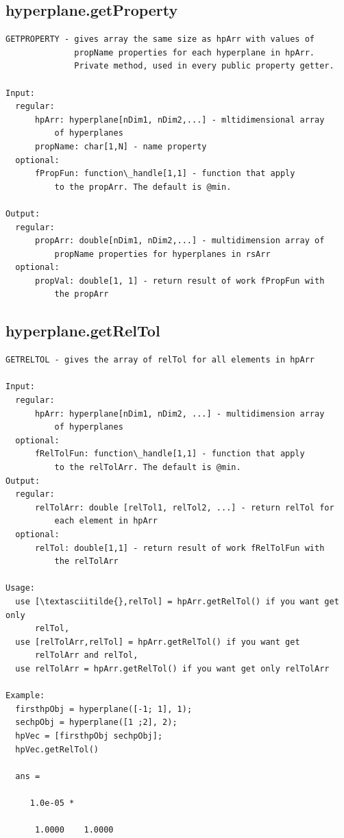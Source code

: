 \documentclass[letterpaper,10pt,english]{sphinxmanual}
\begin{document}
\subsection{hyperplane.getProperty}
\label{chap_functions:hyperplane-getproperty}
\begin{Verbatim}[commandchars=\\\{\}]
GETPROPERTY - gives array the same size as hpArr with values of
              propName properties for each hyperplane in hpArr.
              Private method, used in every public property getter.

Input:
  regular:
      hpArr: hyperplane[nDim1, nDim2,...] - mltidimensional array
          of hyperplanes
      propName: char[1,N] - name property
  optional:
      fPropFun: function\_handle[1,1] - function that apply
          to the propArr. The default is @min.

Output:
  regular:
      propArr: double[nDim1, nDim2,...] - multidimension array of
          propName properties for hyperplanes in rsArr
  optional:
      propVal: double[1, 1] - return result of work fPropFun with
          the propArr
\end{Verbatim}


\subsection{hyperplane.getRelTol}
\label{chap_functions:hyperplane-getreltol}
\begin{Verbatim}[commandchars=\\\{\}]
GETRELTOL - gives the array of relTol for all elements in hpArr

Input:
  regular:
      hpArr: hyperplane[nDim1, nDim2, ...] - multidimension array
          of hyperplanes
  optional:
      fRelTolFun: function\_handle[1,1] - function that apply
          to the relTolArr. The default is @min.
Output:
  regular:
      relTolArr: double [relTol1, relTol2, ...] - return relTol for
          each element in hpArr
  optional:
      relTol: double[1,1] - return result of work fRelTolFun with
          the relTolArr

Usage:
  use [\textasciitilde{},relTol] = hpArr.getRelTol() if you want get only
      relTol,
  use [relTolArr,relTol] = hpArr.getRelTol() if you want get
      relTolArr and relTol,
  use relTolArr = hpArr.getRelTol() if you want get only relTolArr

Example:
  firsthpObj = hyperplane([-1; 1], 1);
  sechpObj = hyperplane([1 ;2], 2);
  hpVec = [firsthpObj sechpObj];
  hpVec.getRelTol()

  ans =

     1.0e-05 *

      1.0000    1.0000
\end{Verbatim}
\end{document}
